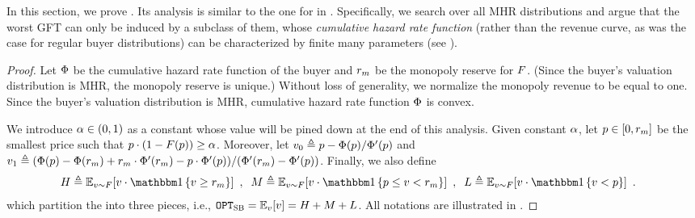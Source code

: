 \label{apx:lemgftprogrammhrbuyer}
In this section, we prove . Its analysis is similar to the one for  in . Specifically, we search over all MHR distributions and argue that the worst GFT can only be induced by a subclass of them, whose \emph{cumulative hazard rate function} (rather than the revenue curve, as was the case for regular buyer distributions) can be characterized by finite many parameters (see ).

\lemgftprogrammhrbuyer*

\begin{proof}
    Let $\Phi$ be the cumulative hazard rate function of the buyer and $r_m$ be the monopoly reserve for $F$. (Since the buyer's valuation distribution is MHR, the monopoly reserve is unique.) Without loss of generality, we normalize the monopoly revenue to be equal to one. Since the buyer's valuation distribution is MHR, cumulative hazard rate function $\Phi$ is convex.
    
     We introduce $\alpha\in(0, 1)$ as a constant whose value will be pined down at the end of this analysis. Given constant $\alpha$, let $p\in[0, r_m]$ be the smallest price such that $p\cdot (1 - F(p)) \geq \alpha$. 
    Moreover, let $v_0 \triangleq p - \Phi(p) / \Phi'(p)$ and $v_1 \triangleq (\Phi(p) - \Phi(r_m) + r_m\cdot \Phi'(r_m) - p\cdot \Phi'(p))/(\Phi'(r_m) - \Phi'(p))$. Finally, we also define 
    \begin{align*}
        H &\triangleq \expect[\val\sim\buyerdist]{\val\cdot \indicator{\val \geq \optreserve}}~,
        \;\;
        M \triangleq \expect[\val\sim\buyerdist]{\val\cdot \indicator{\price \leq \val < \optreserve}}~,
        \;\;
        L \triangleq \expect[\val\sim\buyerdist]{\val\cdot \indicator{ \val < \price}}~.
    \end{align*}
    which partition the {\SecondBest} into three pieces, i.e., $\OPTSB = \expect[\val]{\val} = H + M + L$.
    All notations are illustrated in .


\end{proof}
